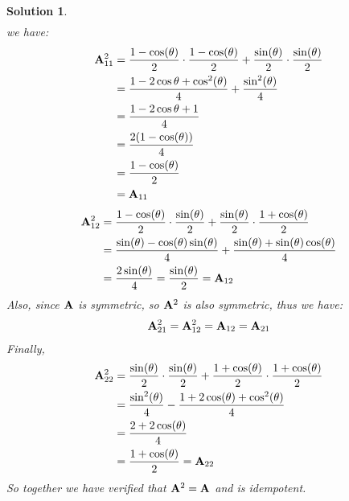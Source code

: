 \documentclass[11pt]{article}\usepackage[]{graphicx}\usepackage[]{color}
\newtheorem{sol}{Solution}
\begin{document}
\begin{sol}
\begin{align*}
	\end{align*}
	we have:
	\begin{align*}
		{\bf A}^2_{11} &= \frac{1 - \cos(\theta)}{2}\cdot \frac{1 - \cos(\theta)}{2} + \frac{\sin(\theta)}{2}\cdot \frac{\sin(\theta)}{2}\\
		&= \frac{1 - 2\cos\theta + \cos^2(\theta)}{4} + \frac{\sin^2(\theta)}{4}\\
		&= \frac{1 - 2\cos\theta + 1}{4}\\
		&= \frac{2(1 - \cos(\theta))}{4}\\
		&= \frac{1 - \cos(\theta)}{2}\\
		&= {\bf A}_{11}
	\end{align*}	
	\begin{align*}
		{\bf A}^2_{12} &= \frac{1 - \cos(\theta)}{2}\cdot \frac{\sin(\theta)}{2} + \frac{\sin(\theta)}{2}\cdot \frac{1 + \cos(\theta)}{2}\\
		&= \frac{\sin(\theta) - \cos(\theta)\sin(\theta)}{4} + \frac{\sin(\theta) + \sin(\theta)\cos(\theta)}{4}\\
		&= \frac{2\sin(\theta)}{4}=  \frac{\sin(\theta)}{2} = {\bf A}_{12}
	\end{align*}
	Also, since ${\bf A}$ is symmetric, so ${\bf A}^2$ is also symmetric, thus we have:
	\begin{align*}
		{\bf A}^2_{21} = {\bf A}^2_{12} = {\bf A}_{12} = {\bf A}_{21}
	\end{align*}
	Finally, 
	\begin{align*}
		{\bf A}^2_{22} &= \frac{\sin(\theta)}{2}\cdot \frac{\sin(\theta)}{2} + \frac{1 + \cos(\theta)}{2}\cdot \frac{1 + \cos(\theta)}{2}\\
		&= \frac{\sin^2(\theta)}{4} - \frac{1 + 2\cos(\theta) + \cos^2(\theta)}{4}\\
		&= \frac{2 + 2\cos(\theta)}{4}\\
		&= \frac{1 + \cos(\theta)}{2} = {\bf A}_{22}
	\end{align*}
	So together we have verified that ${\bf A}^2 = {\bf A}$ and  is idempotent.
\end{sol}
\end{document}
